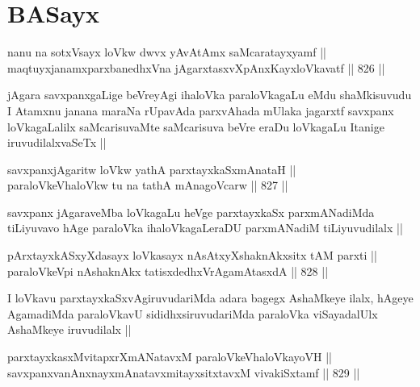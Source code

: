 \section*{BASayx}

\stext


\begin{shl}
nanu na sotxV\s sayx loVkw dwvx yAvAtAmx saMcaratayxyamf || \\
maqtuyxjanamxparxbanedhxVna jAgarxtasxvXpAnxKayxloVkavatf ||  826 ||  
\end{shl}

\begin{artha}
jAgara savxpanxgaLige beVreyAgi ihaloVka paraloVkagaLu eMdu shaMkisuvudu
I Atamxnu janana maraNa rUpavAda parxvAhada mUlaka jagarxtf savxpanx loVkagaLalilx saMcarisuvaMte saMcarisuva beVre eraDu loVkagaLu Itanige iruvudilalxvaSeTx ||
\end{artha}

\begin{shl}
savxpanxjAgaritw loVkw yathA parxtayxkaSxmAnataH || \\
paraloVkeVhaloVkw tu na tathA mAnagoVcarw ||  827 ||  
\end{shl}

\begin{artha}
savxpanx jAgaraveMba loVkagaLu heVge parxtayxkaSx parxmANadiMda tiLiyuvavo hAge paraloVka ihaloVkagaLeraDU parxmANadiM tiLiyuvudilalx ||
\end{artha}


\begin{shl}
pArxtayxkASxyXdasayx loVkasayx nAsAtxyXshaknAkx\s sitx tAM parxti || \\
paraloVkeV\s pi nA\s \s shaknAkx tatisxdedhxVrAgamAtasxdA ||  828 ||  
\end{shl}

\begin{artha}
I loVkavu parxtayxkaSxvAgiruvudariMda adara bagegx AshaMkeye ilalx, hAgeye AgamadiMda paraloVkavU sididhxsiruvudariMda paraloVka viSayadalUlx AshaMkeye iruvudilalx ||
\end{artha}


\begin{shl}
parxtayxkasxMvitapxrXmANatavxM paraloVkeVhaloVkayoVH || \\
savxpanxvanAnxnayxmAnatavxmitayxsitxtavxM vivakiSxtamf ||  829 ||  
\end{shl}
				
